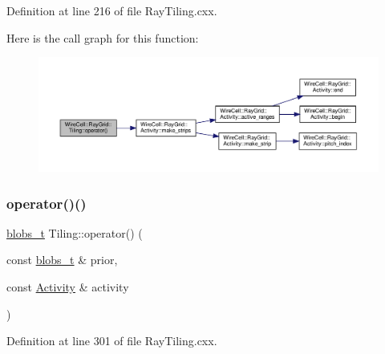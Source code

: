 Definition at line 216 of file Ray\+Tiling.\+cxx.

Here is the call graph for this function\+:
\nopagebreak
\begin{figure}[H]
\begin{center}
\leavevmode
\includegraphics[width=350pt]{class_wire_cell_1_1_ray_grid_1_1_tiling_a9ca2b3532778d7582d8166e7b96db7c3_cgraph}
\end{center}
\end{figure}
\mbox{\label{class_wire_cell_1_1_ray_grid_1_1_tiling_a1f7992b6111368304757bd5bab3346e0}} 
\subsubsection{\texorpdfstring{operator()()}{operator()()}\hspace{0.1cm}{\footnotesize\ttfamily [2/2]}}
{\footnotesize\ttfamily \hyperlink{namespace_wire_cell_1_1_ray_grid_aea2069aff62790df3241ee7446e81ade}{blobs\+\_\+t} Tiling\+::operator() (\begin{DoxyParamCaption}\item[{const \hyperlink{namespace_wire_cell_1_1_ray_grid_aea2069aff62790df3241ee7446e81ade}{blobs\+\_\+t} \&}]{prior,  }\item[{const \hyperlink{class_wire_cell_1_1_ray_grid_1_1_activity}{Activity} \&}]{activity }\end{DoxyParamCaption})}



Definition at line 301 of file Ray\+Tiling.\+cxx.

